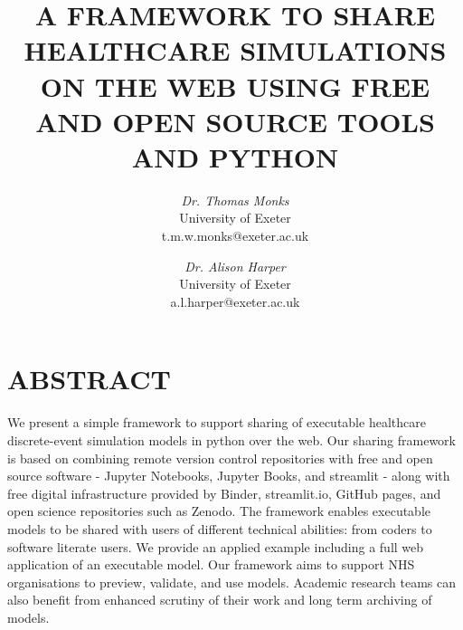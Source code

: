 \documentclass{swpaperproc}
\theoremstyle{sw}
\begin{document}
%
%

\title{A FRAMEWORK TO SHARE HEALTHCARE SIMULATIONS ON THE WEB USING FREE AND OPEN SOURCE TOOLS AND PYTHON}

\author{\textit{Dr. Thomas Monks}\\ [11pt]
University of Exeter\\
t.m.w.monks@exeter.ac.uk\\
\and
\textit{Dr. Alison Harper}\\[11pt]
University of Exeter\\
a.l.harper@exeter.ac.uk\\
}

\maketitle

\section*{ABSTRACT}

We present a simple framework to  support sharing of executable healthcare discrete-event simulation models in python over the web. Our sharing framework is based on combining remote version control repositories with free and open source software - Jupyter Notebooks, Jupyter Books, and streamlit  - along with free digital infrastructure provided by Binder, streamlit.io, GitHub
pages, and open science repositories such as Zenodo. The framework enables executable models to be shared with users of different technical abilities: from coders to software literate users.  We provide an applied example including a full web application of an executable model.   Our framework aims to support NHS organisations to preview, validate, and use models. Academic research teams can also benefit from enhanced scrutiny of their work and long term archiving of models.  
\end{document}
